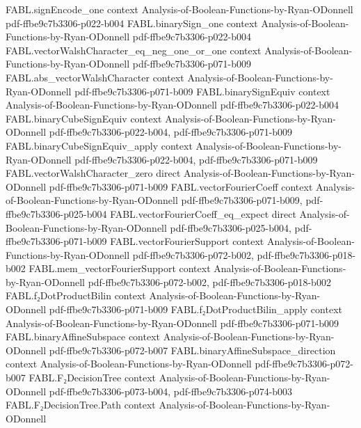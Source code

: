 \begin{theorem}
\proofstep
  {FABL.signEncode_one}
  {context}
  {Analysis-of-Boolean-Functions-by-Ryan-ODonnell}
  {pdf-ffbe9c7b3306-p022-b004}
\proofstep
  {FABL.binarySign_one}
  {context}
  {Analysis-of-Boolean-Functions-by-Ryan-ODonnell}
  {pdf-ffbe9c7b3306-p022-b004}
\proofstep
  {FABL.vectorWalshCharacter_eq_neg_one_or_one}
  {context}
  {Analysis-of-Boolean-Functions-by-Ryan-ODonnell}
  {pdf-ffbe9c7b3306-p071-b009}
\proofstep
  {FABL.abs_vectorWalshCharacter}
  {context}
  {Analysis-of-Boolean-Functions-by-Ryan-ODonnell}
  {pdf-ffbe9c7b3306-p071-b009}
\proofstep
  {FABL.binarySignEquiv}
  {context}
  {Analysis-of-Boolean-Functions-by-Ryan-ODonnell}
  {pdf-ffbe9c7b3306-p022-b004}
\proofstep
  {FABL.binaryCubeSignEquiv}
  {context}
  {Analysis-of-Boolean-Functions-by-Ryan-ODonnell}
  {pdf-ffbe9c7b3306-p022-b004,
    pdf-ffbe9c7b3306-p071-b009}
\proofstep
  {FABL.binaryCubeSignEquiv_apply}
  {context}
  {Analysis-of-Boolean-Functions-by-Ryan-ODonnell}
  {pdf-ffbe9c7b3306-p022-b004,
    pdf-ffbe9c7b3306-p071-b009}
\proofstep
  {FABL.vectorWalshCharacter_zero}
  {direct}
  {Analysis-of-Boolean-Functions-by-Ryan-ODonnell}
  {pdf-ffbe9c7b3306-p071-b009}
\proofstep
  {FABL.vectorFourierCoeff}
  {context}
  {Analysis-of-Boolean-Functions-by-Ryan-ODonnell}
  {pdf-ffbe9c7b3306-p071-b009,
    pdf-ffbe9c7b3306-p025-b004}
\proofstep
  {FABL.vectorFourierCoeff_eq_expect}
  {direct}
  {Analysis-of-Boolean-Functions-by-Ryan-ODonnell}
  {pdf-ffbe9c7b3306-p025-b004,
    pdf-ffbe9c7b3306-p071-b009}
\proofstep
  {FABL.vectorFourierSupport}
  {context}
  {Analysis-of-Boolean-Functions-by-Ryan-ODonnell}
  {pdf-ffbe9c7b3306-p072-b002,
    pdf-ffbe9c7b3306-p018-b002}
\proofstep
  {FABL.mem_vectorFourierSupport}
  {context}
  {Analysis-of-Boolean-Functions-by-Ryan-ODonnell}
  {pdf-ffbe9c7b3306-p072-b002,
    pdf-ffbe9c7b3306-p018-b002}
\proofstep
  {FABL.f₂DotProductBilin}
  {context}
  {Analysis-of-Boolean-Functions-by-Ryan-ODonnell}
  {pdf-ffbe9c7b3306-p071-b009}
\proofstep
  {FABL.f₂DotProductBilin_apply}
  {context}
  {Analysis-of-Boolean-Functions-by-Ryan-ODonnell}
  {pdf-ffbe9c7b3306-p071-b009}
\proofstep
  {FABL.binaryAffineSubspace}
  {context}
  {Analysis-of-Boolean-Functions-by-Ryan-ODonnell}
  {pdf-ffbe9c7b3306-p072-b007}
\proofstep
  {FABL.binaryAffineSubspace_direction}
  {context}
  {Analysis-of-Boolean-Functions-by-Ryan-ODonnell}
  {pdf-ffbe9c7b3306-p072-b007}
\proofstep
  {FABL.F₂DecisionTree}
  {context}
  {Analysis-of-Boolean-Functions-by-Ryan-ODonnell}
  {pdf-ffbe9c7b3306-p073-b004,
    pdf-ffbe9c7b3306-p074-b003}
\proofstep
  {FABL.F₂DecisionTree.Path}
  {context}
  {Analysis-of-Boolean-Functions-by-Ryan-ODonnell}

\end{theorem}
